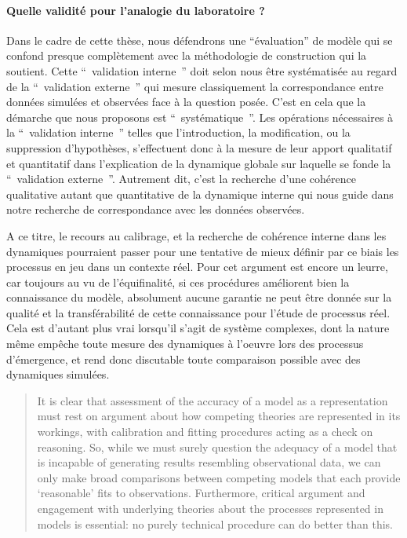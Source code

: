 
\paragraph{Quelle validité pour l'analogie du laboratoire ?}


Dans le cadre de cette thèse, nous défendrons une \enquote{évaluation} de modèle qui se confond presque complètement avec la méthodologie de construction qui la soutient. Cette \enquote{ validation interne } doit selon nous être systématisée au regard de la \enquote{ validation externe } qui mesure classiquement la correspondance entre données simulées et observées face à la question posée. C’est en cela que la démarche que nous proposons est \enquote{ systématique }. Les opérations nécessaires à la \enquote{ validation interne } telles que l'introduction, la modification, ou la suppression d'hypothèses, s’effectuent donc à la mesure de leur apport qualitatif et quantitatif dans l'explication de la dynamique globale sur laquelle se fonde la \enquote{ validation externe }. Autrement dit, c'est la recherche d'une cohérence qualitative autant que quantitative de la dynamique interne qui nous guide dans notre recherche de correspondance avec les données observées.

A ce titre, le recours au calibrage, et la recherche de cohérence interne dans les dynamiques pourraient passer pour une tentative de mieux définir par ce biais les processus en jeu dans un contexte réel. Pour \autocite{OSullivan2004} cet argument est encore un leurre, car toujours au vu de l'équifinalité, si ces procédures améliorent bien la connaissance du modèle, absolument aucune garantie ne peut être donnée sur la qualité et la transférabilité de cette connaissance pour l'étude de processus réel. Cela est d'autant plus vrai lorsqu'il s'agit de système complexes, dont la nature même empêche toute  mesure des dynamiques à l'oeuvre lors des processus d'émergence, et rend donc discutable toute comparaison possible avec des dynamiques simulées.

\begin{quotation} It is clear that assessment of the accuracy of a model as a representation must rest on argument about how competing theories are represented in its workings, with calibration and fitting procedures acting as a check on reasoning. So, while we must surely question the adequacy of a model that is incapable of generating results resembling observational data, we can only make broad comparisons between competing models that each provide ‘reasonable’ fits to observations. Furthermore, critical argument and engagement with underlying theories about the processes represented in models is essential: no purely technical procedure can do better than this.  \\  \end{quotation}

